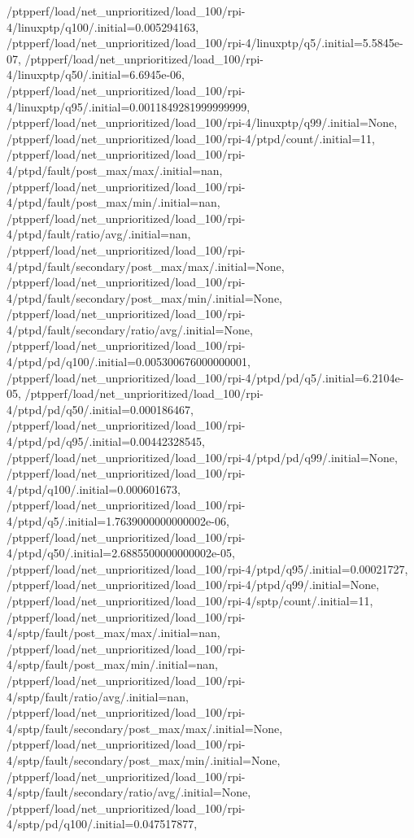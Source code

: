 {    /ptpperf/load/net_unprioritized/load_100/rpi-4/linuxptp/q100/.initial=0.005294163,
    /ptpperf/load/net_unprioritized/load_100/rpi-4/linuxptp/q5/.initial=5.5845e-07,
    /ptpperf/load/net_unprioritized/load_100/rpi-4/linuxptp/q50/.initial=6.6945e-06,
    /ptpperf/load/net_unprioritized/load_100/rpi-4/linuxptp/q95/.initial=0.0011849281999999999,
    /ptpperf/load/net_unprioritized/load_100/rpi-4/linuxptp/q99/.initial=None,
    /ptpperf/load/net_unprioritized/load_100/rpi-4/ptpd/count/.initial=11,
    /ptpperf/load/net_unprioritized/load_100/rpi-4/ptpd/fault/post_max/max/.initial=nan,
    /ptpperf/load/net_unprioritized/load_100/rpi-4/ptpd/fault/post_max/min/.initial=nan,
    /ptpperf/load/net_unprioritized/load_100/rpi-4/ptpd/fault/ratio/avg/.initial=nan,
    /ptpperf/load/net_unprioritized/load_100/rpi-4/ptpd/fault/secondary/post_max/max/.initial=None,
    /ptpperf/load/net_unprioritized/load_100/rpi-4/ptpd/fault/secondary/post_max/min/.initial=None,
    /ptpperf/load/net_unprioritized/load_100/rpi-4/ptpd/fault/secondary/ratio/avg/.initial=None,
    /ptpperf/load/net_unprioritized/load_100/rpi-4/ptpd/pd/q100/.initial=0.005300676000000001,
    /ptpperf/load/net_unprioritized/load_100/rpi-4/ptpd/pd/q5/.initial=6.2104e-05,
    /ptpperf/load/net_unprioritized/load_100/rpi-4/ptpd/pd/q50/.initial=0.000186467,
    /ptpperf/load/net_unprioritized/load_100/rpi-4/ptpd/pd/q95/.initial=0.00442328545,
    /ptpperf/load/net_unprioritized/load_100/rpi-4/ptpd/pd/q99/.initial=None,
    /ptpperf/load/net_unprioritized/load_100/rpi-4/ptpd/q100/.initial=0.000601673,
    /ptpperf/load/net_unprioritized/load_100/rpi-4/ptpd/q5/.initial=1.7639000000000002e-06,
    /ptpperf/load/net_unprioritized/load_100/rpi-4/ptpd/q50/.initial=2.6885500000000002e-05,
    /ptpperf/load/net_unprioritized/load_100/rpi-4/ptpd/q95/.initial=0.00021727,
    /ptpperf/load/net_unprioritized/load_100/rpi-4/ptpd/q99/.initial=None,
    /ptpperf/load/net_unprioritized/load_100/rpi-4/sptp/count/.initial=11,
    /ptpperf/load/net_unprioritized/load_100/rpi-4/sptp/fault/post_max/max/.initial=nan,
    /ptpperf/load/net_unprioritized/load_100/rpi-4/sptp/fault/post_max/min/.initial=nan,
    /ptpperf/load/net_unprioritized/load_100/rpi-4/sptp/fault/ratio/avg/.initial=nan,
    /ptpperf/load/net_unprioritized/load_100/rpi-4/sptp/fault/secondary/post_max/max/.initial=None,
    /ptpperf/load/net_unprioritized/load_100/rpi-4/sptp/fault/secondary/post_max/min/.initial=None,
    /ptpperf/load/net_unprioritized/load_100/rpi-4/sptp/fault/secondary/ratio/avg/.initial=None,
    /ptpperf/load/net_unprioritized/load_100/rpi-4/sptp/pd/q100/.initial=0.047517877,
}
